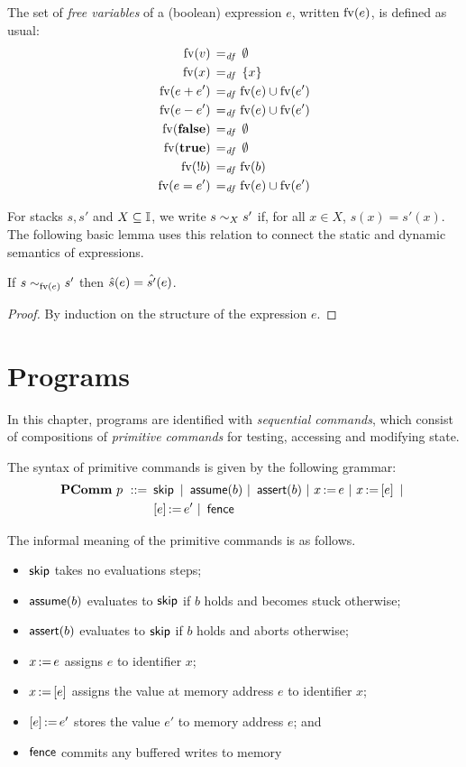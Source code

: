 \documentclass[11pt]{report}
\begin{document}
The set of \emph{free variables} of a (boolean) expression $e$, written $\mathrm{fv}(e)$, is defined as usual: \begin{align*}
    \mathrm{fv}(v) \operatorname{\;=_{\mathit{df}}\;} & \operatorname{\emptyset} \\ 
    \mathrm{fv}(x) \operatorname{\;=_{\mathit{df}}\;} & \left\lbrace x \right\rbrace \\ 
    \mathrm{fv}(e + e') \operatorname{\;=_{\mathit{df}}\;} & \mathrm{fv}(e) \cup \mathrm{fv}(e') \\ 
    \mathrm{fv}(e - e') \operatorname{\;=_{\mathit{df}}\;} & \mathrm{fv}(e) \cup \mathrm{fv}(e') \\ 
    \mathrm{fv}(\mathbf{false}) \operatorname{\;=_{\mathit{df}}\;} & \operatorname{\emptyset} \\ 
    \mathrm{fv}(\mathbf{true}) \operatorname{\;=_{\mathit{df}}\;} & \operatorname{\emptyset} \\ 
    \mathrm{fv}(!b) \operatorname{\;=_{\mathit{df}}\;} & \mathrm{fv}(b) \\ 
    \mathrm{fv}(e = e') \operatorname{\;=_{\mathit{df}}\;} & \mathrm{fv}(e) \cup \mathrm{fv}(e')
\end{align*}

For stacks $s,s'$ and $X \subseteq \mathbb{I}$, we write $s \sim_{X} s'$ if, for all $x \in X$, $s(x) = s'(x)$. The following basic lemma uses this relation to connect the static and dynamic semantics of expressions. 
\begin{lemma}
\label{lem:exp-stcong}
    If $s \sim_{\mathrm{fv}(e)} s'$ then $\hat{s}(e) = \hat{s'}(e)$. 
\end{lemma}

\begin{proof}
By induction on the structure of the expression $e$. 
\end{proof}

\section{Programs}
\label{sec:sequential-programs}

In this chapter, programs are identified with \emph{sequential commands}, which consist of compositions of \emph{primitive commands} for testing, accessing and modifying state. 

The syntax of primitive commands is given by the following grammar: \begin{align*} \mathbf{PComm}~p ~::=~ & \operatorname{\mathsf{skip}} ~|~ \operatorname{\mathsf{assume}}(b) ~|~ \operatorname{\mathsf{assert}}(b) ~|~ x \operatorname{:\!=} e ~|~ x \operatorname{:\!=} \left[ e \right] ~|~ \\ 
    & \left[ e \right] \operatorname{:\!=} e' ~|~ \operatorname{\mathsf{fence}}
\end{align*}

The informal meaning of the primitive commands is as follows. \begin{itemize}
    \item $\operatorname{\mathsf{skip}}$ takes no evaluations steps;
    \item $\operatorname{\mathsf{assume}}(b)$ evaluates to $\operatorname{\mathsf{skip}}$ if $b$ holds and becomes stuck otherwise; 
    \item $\operatorname{\mathsf{assert}}(b)$ evaluates to $\operatorname{\mathsf{skip}}$ if $b$ holds and aborts otherwise;
    \item $x \operatorname{:\!=} e$ assigns $e$ to identifier $x$; 
    \item $x \operatorname{:\!=} \left[ e \right]$ assigns the value at memory address $e$ to identifier $x$; 
    \item $\left[ e \right] \operatorname{:\!=} e'$ stores the value $e'$ to memory address $e$; and
    \item $\operatorname{\mathsf{fence}}$ commits any buffered writes to memory 
\end{itemize}
\end{document}
